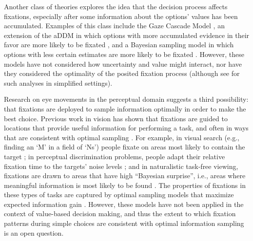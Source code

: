 Another class of theories explores the idea that the decision process affects fixations, especially after some information about the options' values has been accumulated. Examples of this class include the Gaze Cascade Model \citep{shimojo2003gaze}, an extension of the aDDM in which options with more accumulated evidence in their favor are more likely to be fixated \citep{gluth2020valuebased}, and a Bayesian sampling model in which options with less certain estimates are more likely to be fixated \citep{song2019proactive}. However, these models have not considered how uncertainty and value might interact, nor have they considered the optimality of the posited fixation process (although see \citealp{sepulveda2020visual,moreno-bote2020heuristics,ramirez-ruiz2021optimal} for such analyses in simplified settings).

Research on eye movements in the perceptual domain suggests a third possibility: that fixations are deployed to sample information optimally in order to make the best choice. Previous work in vision has shown that fixations are guided to locations that provide useful information for performing a task, and often in ways that are consistent with optimal sampling \citep{gottlieb2018neuroscience}. For example, in visual search (e.g., finding an `M' in a field of `Ns') people fixate on areas most likely to contain the target \citep{najemnik2005optimal,eckstein2011visual}; in perceptual discrimination problems, people adapt their relative fixation time to the targets' noise levels \citep{cassey2013adaptive,ludwig2017information}; and in naturalistic task-free viewing, fixations are drawn to areas that have high ``Bayesian surprise'', i.e., areas where meaningful information is most likely to be found \citep{itti2009bayesian}. The properties of fixations in these types of tasks are captured by optimal sampling models that maximize expected information gain \citep{gottlieb2013informationseeking,gottlieb2018neuroscience}.
However, these models have not been applied in the context of value-based decision making, and thus the extent to which fixation patterns during simple choices are consistent with optimal information sampling is an open question.


